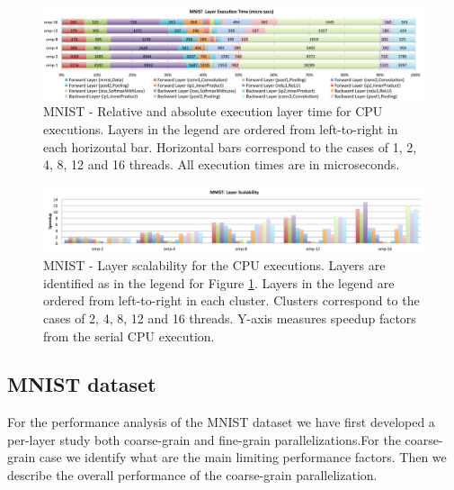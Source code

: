
\begin{figure}[]
\includegraphics[width=\linewidth]{figures/mnist-rel-abs-time.pdf}
\caption{MNIST - Relative and absolute execution layer time for CPU executions. Layers in the legend are ordered from left-to-right in each horizontal bar. Horizontal bars correspond to the cases of 1, 2, 4, 8, 12 and 16 threads. All execution times are in microseconds.}
\label{fig-mnist-abs-rel}
\end{figure}

\begin{figure}[]
\includegraphics[width=\textwidth]{figures/mnist-scalability-layer.pdf}
\caption{MNIST - Layer scalability for the CPU executions. Layers are identified as in the legend for Figure \ref{fig-mnist-abs-rel}. Layers in the legend are ordered from left-to-right in each cluster. Clusters correspond to the cases of 2, 4, 8, 12 and 16 threads. Y-axis measures speedup factors from the serial CPU execution.}
\label{fig-mnist-scalability}
\end{figure}

\subsection{MNIST dataset}
For the performance analysis of the MNIST dataset we have first 
developed a per-layer study both coarse-grain and fine-grain parallelizations.For the coarse-grain case we identify what are the main limiting 
performance factors. Then we describe the overall performance of the 
coarse-grain parallelization. 

